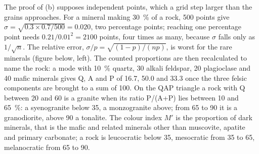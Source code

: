 The proof of (b) supposes independent points, which a grid step larger than the grains
approaches. For a mineral making \qty{30}{\percent} of a rock, 500 points give $\sigma =
\sqrt{0.3 \times 0.7/500} = 0.020$, two percentage points; reaching one percentage point needs
$0.21/0.01^2 = 2100$ points, four times as many, because $\sigma$ falls only as $1/\sqrt n$. The
relative error, $\sigma/p = \sqrt{(1-p)/(np)}$, is worst for the rare minerals (figure below,
left). The counted proportions are then recalculated to name the rock: a mode with
\qty{10}{\percent} quartz, 30 alkali feldspar, 20 plagioclase and 40 mafic minerals gives Q, A and
P of 16.7, 50.0 and 33.3 once the three felsic components are brought to a sum of 100. On the QAP
triangle a rock with Q between 20 and 60 is a granite when its ratio P/(A+P) lies between 10 and
\qty{65}{\percent}: a syenogranite below 35, a monzogranite above; from 65 to 90 it is a
granodiorite, above 90 a tonalite. The colour index $M'$ is the proportion of dark minerals, that
is the mafic and related minerals other than muscovite, apatite and primary carbonate; a rock is
leucocratic below 35, mesocratic from 35 to 65, melanocratic from 65 to 90.


